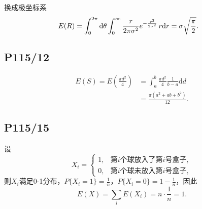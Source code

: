 \documentclass[UTF8,a4paper,10pt]{ctexart}
\begin{document}
换成极坐标系
\begin{align}
    E(R) &= \int_0^{2\pi}\text{d}\theta \int_0^\infty {r\over 2\pi \sigma^2}e^{-{r^2\over 2\sigma^2}}\,r\text{d}r = \sigma \sqrt{\pi\over2}.
\end{align}


\subsection{P115/12}
\begin{align}
    E(S) = E\left(\frac{\pi d^2}{4}\right) &= \int_a^b \frac{\pi d^2}{4}\frac{1}{b - a} \text{d} d \nonumber \\
                                           &= \frac{\pi(a^2 + ab + b^2)}{12}.
\end{align}

\subsection{P115/15}
设
\begin{equation}
    X_i = \left\{
    \begin{array}{lr}
    1,& \mbox{第$i$个球放入了第$i$号盒子}, \\
    0, & \mbox{第$i$个球未放入第$i$号盒子},
    \end{array}
    \right.
\end{equation}
则$X_i$满足0-1分布，$P\{X_i = 1\} = \displaystyle\frac{1}{n}$，$P\{X_i = 0\} = 1-\displaystyle\frac{1}{n}$，因此
\begin{equation}
    E(X) = \sum_i E(X_i) = n\cdot\frac{1}{n} = 1.
\end{equation}
\end{document}
